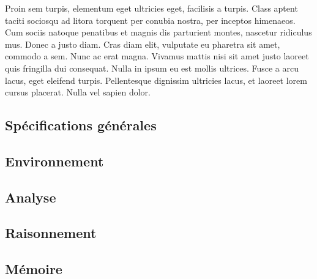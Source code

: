 Proin sem turpis, elementum eget ultricies eget, facilisis a turpis. Class aptent taciti sociosqu ad litora torquent per conubia nostra, per inceptos himenaeos. Cum sociis natoque penatibus et magnis dis parturient montes, nascetur ridiculus mus. Donec a justo diam. Cras diam elit, vulputate eu pharetra sit amet, commodo a sem. Nunc ac erat magna. Vivamus mattis nisi sit amet justo laoreet quis fringilla dui consequat. Nulla in ipsum eu est mollis ultrices. Fusce a arcu lacus, eget eleifend turpis. Pellentesque dignissim ultricies lacus, et laoreet lorem cursus placerat. Nulla vel sapien dolor. 

\subsection{Spécifications générales}



\subsection{Environnement}



\subsection{Analyse}



\subsection{Raisonnement}



\subsection{Mémoire}

